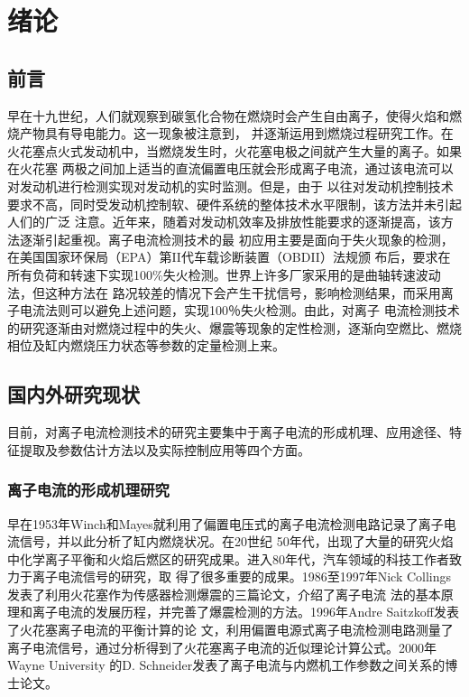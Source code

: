 \chapter{绪论}
\section{前言}
早在十九世纪，人们就观察到碳氢化合物在燃烧时会产生自由离子，使得火焰和燃烧产物具有导电能力。这一现象被注意到，
并逐渐运用到燃烧过程研究工作。在火花塞点火式发动机中，当燃烧发生时，火花塞电极之间就产生大量的离子。如果在火花塞
两极之间加上适当的直流偏置电压就会形成离子电流，通过该电流可以对发动机进行检测实现对发动机的实时监测。但是，由于
以往对发动机控制技术要求不高，同时受发动机控制软、硬件系统的整体技术水平限制，该方法并未引起人们的广泛
注意。近年来，随着对发动机效率及排放性能要求的逐渐提高，该方法逐渐引起重视。离子电流检测技术的最
初应用主要是面向于失火现象的检测，在美国国家环保局（EPA）第II代车载诊断装置（OBDII）法规颁
布后，要求在所有负荷和转速下实现100\%失火检测\cite{grzys}。世界上许多厂家采用的是曲轴转速波动法，但这种方法在
路况较差的情况下会产生干扰信号，影响检测结果，而采用离子电流法则可以避免上述问题，实现100％失火检测。由此，对离子
电流检测技术的研究逐渐由对燃烧过程中的失火、爆震等现象的定性检测，逐渐向空燃比、燃烧相位及缸内燃烧压力状态等参数的定量检测上来。
\section{国内外研究现状}
目前，对离子电流检测技术的研究主要集中于离子电流的形成机理、应用途径、特征提取及参数估计方法以及实际控制应用等四个方面。
\subsection{离子电流的形成机理研究}
早在1953年Winch和Mayes\cite{winch1953method}就利用了偏置电压式的离子电流检测电路记录了离子电流信号，并以此分析了缸内燃烧状况。在20世纪
50年代，出现了大量的研究火焰中化学离子平衡和火焰后燃区的研究成果。进入80年代，汽车领域的科技工作者致力于离子电流信号的研究，取
得了很多重要的成果。1986至1997年Nick Collings\cite{collings1986knock,collings1991plug,collings1985knock}发表了利用火花塞作为传感器检测爆震的三篇论文，介绍了离子电流
法的基本原理和离子电流的发展历程，并完善了爆震检测的方法。1996年Andre Saitzkoff\cite{saitzkoff1996ionization}发表了火花塞离子电流的平衡计算的论
文，利用偏置电源式离子电流检测电路测量了离子电流信号，通过分析得到了火花塞离子电流的近似理论计算公式。2000年Wayne University
的D. Schneider\cite{schneider2000experimental}发表了离子电流与内燃机工作参数之间关系的博士论文。

